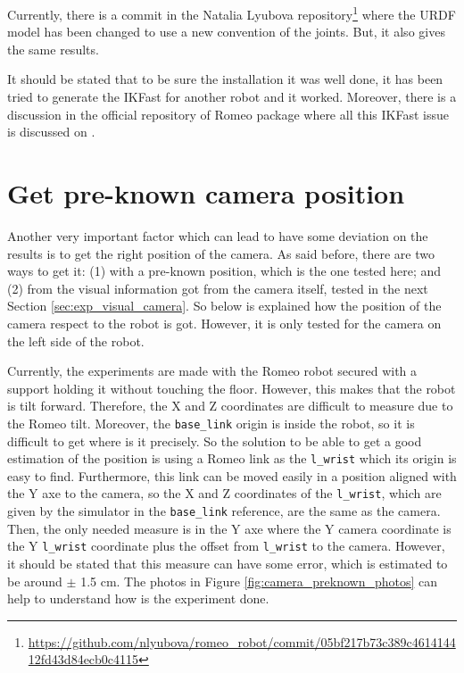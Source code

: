 \documentclass[12pt,a4paper,final,twoside,openright]{report}
\begin{document}
Currently, there is a commit in the Natalia Lyubova repository\footnote{\url{https://github.com/nlyubova/romeo_robot/commit/05bf217b73c389c461414412fd43d84ecb0c4115}} where the URDF model has been changed to use a new convention of the joints. But, it also gives the same results. 

It should be stated that to be sure the installation it was well done, it has been tried to generate the IKFast for another robot and it worked. Moreover, there is a discussion in the official repository of Romeo package where all this IKFast issue is discussed on \cite{romeoRobotIssue}. 

\section{Get pre-known camera position}
\label{sec:exp_camera_preknown}

Another very important factor which can lead to have some deviation on the results is to get the right position of the camera. As said before, there are two ways to get it: (1) with a pre-known position, which is the one tested here; and (2) from the visual information got from the camera itself, tested in the next Section \ref{sec:exp_visual_camera}. So below is explained how the position of the camera respect to the robot is got. However, it is only tested for the camera on the left side of the robot.

Currently, the experiments are made with the Romeo robot secured with a support holding it without touching the floor. However, this makes that the robot is tilt forward. Therefore, the X and Z coordinates are difficult to measure due to the Romeo tilt. Moreover, the \texttt{base\_link} origin is inside the robot, so it is difficult to get where is it precisely. So the solution to be able to get a good estimation of the position is using a Romeo link as the \texttt{l\_wrist} which its origin is easy to find. Furthermore, this link can be moved easily in a position aligned with the Y axe to the camera, so the X and Z coordinates of the \texttt{l\_wrist}, which are given by the simulator in the \texttt{base\_link} reference, are the same as the camera. Then, the only needed measure is in the Y axe where the Y camera coordinate is the Y \texttt{l\_wrist} coordinate plus the offset from \texttt{l\_wrist} to the camera. However, it should be stated that this measure can have some error, which is estimated to be around $\pm$ 1.5 cm. The photos in Figure \ref{fig:camera_preknown_photos} can help to understand how is the experiment done.
\end{document}
